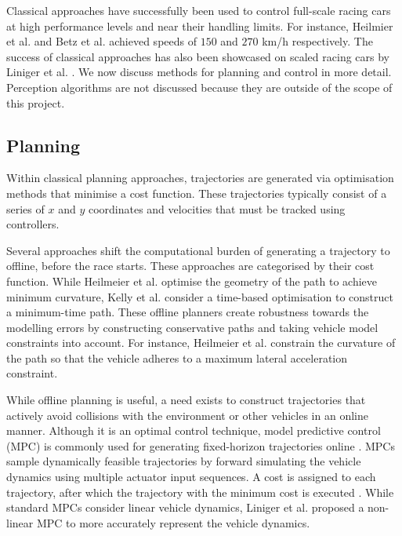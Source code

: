 Classical approaches have successfully been used to control full-scale racing cars \cite{Valls2018, alvarez2022, Nekkah2020} at high performance levels and near their handling limits.
For instance, Heilmier et al. \cite{Heilmeier2020} and
Betz et al. \cite{Betz_2023} achieved speeds of $150$ and $270$ km/h respectively.
The success of classical approaches has also been showcased on scaled racing cars by Liniger et al. \cite{Liniger2015}.
We now discuss methods for planning and control in more detail.
Perception algorithms are not discussed because they are outside of the scope of this project.

\subsection{Planning}\label{sec:trajectory_planning}
Within classical planning approaches, trajectories are generated via optimisation methods that minimise a cost function.
These trajectories typically consist of a series of $x$ and $y$ coordinates and velocities that must be tracked using controllers.

Several approaches \cite{Heilmeier2020, Kelly2010, Herrmann2019} shift the computational burden of generating a trajectory to offline, before the race starts.
These approaches are categorised by their cost function.
While Heilmeier et al. \cite{Heilmeier2020} optimise the geometry of the path to achieve minimum curvature, Kelly et al. \cite{Kelly2010} consider a time-based optimisation to construct a minimum-time path.
These offline planners create robustness towards the modelling errors by constructing conservative paths and taking vehicle model constraints into account.
For instance, Heilmeier et al. \cite{Heilmeier2020} constrain the curvature of the path so that the vehicle adheres to a maximum lateral acceleration constraint.

While offline planning is useful, a need exists to construct trajectories that actively avoid collisions with the environment or other vehicles in an online manner.
Although it is an optimal control technique, model predictive control (MPC) is commonly used for generating fixed-horizon trajectories online \cite{Liniger2015, Liniger2015a, Anderson2016, Funke2017}.
MPCs sample dynamically feasible trajectories by forward simulating the vehicle dynamics using multiple actuator input sequences.
A cost is assigned to each trajectory, after which the trajectory with the minimum cost is executed \cite{Betz2021}. 
While standard MPCs consider linear vehicle dynamics, Liniger et al. \cite{Liniger2015} proposed a non-linear MPC to more accurately represent the vehicle dynamics.

